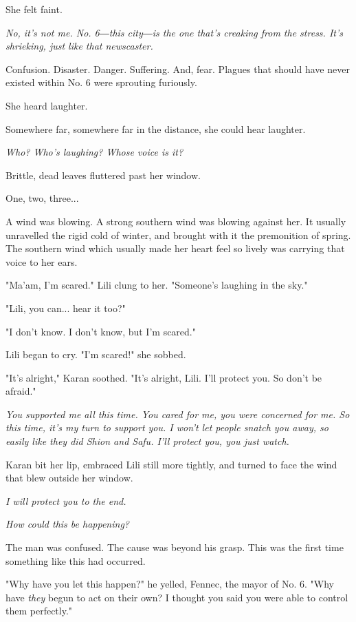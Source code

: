 She felt faint.

\emph{No, it's not me. No. 6―this city―is the one that's creaking from the
	stress. It's shrieking, just like that newscaster.}

Confusion. Disaster. Danger. Suffering. And, fear. Plagues that should
have never existed within No. 6 were sprouting furiously.

She heard laughter.

Somewhere far, somewhere far in the distance, she could hear laughter.

\emph{Who? Who's laughing? Whose voice is it?}

Brittle, dead leaves fluttered past her window.

One, two, three...

A wind was blowing. A strong southern wind was blowing against her. It
usually unravelled the rigid cold of winter, and brought with it the
premonition of spring. The southern wind which usually made her heart
feel so lively was carrying that voice to her ears.

"Ma'am, I'm scared." Lili clung to her. "Someone's laughing in the sky."

"Lili, you can... hear it too?"

"I don't know. I don't know, but I'm scared."

Lili began to cry. "I'm scared!" she sobbed.

"It's alright," Karan soothed. "It's alright, Lili. I'll protect you. So
don't be afraid."

\emph{You supported me all this time. You cared for me, you were concerned for
	me. So this time, it's my turn to support you. I won't let people snatch
	you away, so easily like they did Shion and Safu. I'll protect you, you
	just watch.}

Karan bit her lip, embraced Lili still more tightly, and turned to face
the wind that blew outside her window.

\emph{I will protect you to the end.}

\mybreak

\emph{How could this be happening?}

The man was confused. The cause was beyond his grasp. This was the first
time something like this had occurred.

"Why have you let this happen?" he yelled, Fennec, the mayor of No. 6.
"Why have \emph{they} begun to act on their own? I thought you said you were
able to control them perfectly."

